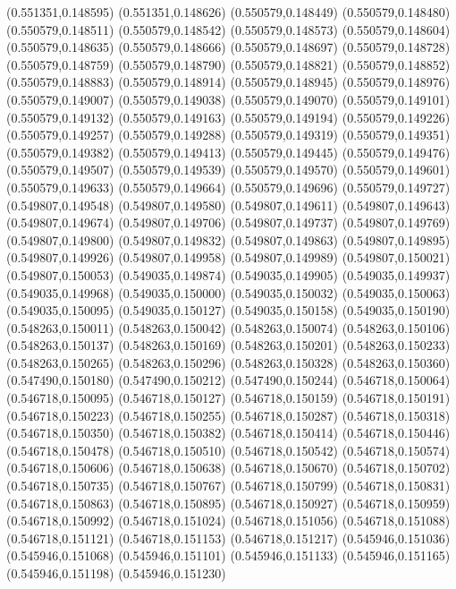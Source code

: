 (0.551351,0.148595)
(0.551351,0.148626)
(0.550579,0.148449)
(0.550579,0.148480)
(0.550579,0.148511)
(0.550579,0.148542)
(0.550579,0.148573)
(0.550579,0.148604)
(0.550579,0.148635)
(0.550579,0.148666)
(0.550579,0.148697)
(0.550579,0.148728)
(0.550579,0.148759)
(0.550579,0.148790)
(0.550579,0.148821)
(0.550579,0.148852)
(0.550579,0.148883)
(0.550579,0.148914)
(0.550579,0.148945)
(0.550579,0.148976)
(0.550579,0.149007)
(0.550579,0.149038)
(0.550579,0.149070)
(0.550579,0.149101)
(0.550579,0.149132)
(0.550579,0.149163)
(0.550579,0.149194)
(0.550579,0.149226)
(0.550579,0.149257)
(0.550579,0.149288)
(0.550579,0.149319)
(0.550579,0.149351)
(0.550579,0.149382)
(0.550579,0.149413)
(0.550579,0.149445)
(0.550579,0.149476)
(0.550579,0.149507)
(0.550579,0.149539)
(0.550579,0.149570)
(0.550579,0.149601)
(0.550579,0.149633)
(0.550579,0.149664)
(0.550579,0.149696)
(0.550579,0.149727)
(0.549807,0.149548)
(0.549807,0.149580)
(0.549807,0.149611)
(0.549807,0.149643)
(0.549807,0.149674)
(0.549807,0.149706)
(0.549807,0.149737)
(0.549807,0.149769)
(0.549807,0.149800)
(0.549807,0.149832)
(0.549807,0.149863)
(0.549807,0.149895)
(0.549807,0.149926)
(0.549807,0.149958)
(0.549807,0.149989)
(0.549807,0.150021)
(0.549807,0.150053)
(0.549035,0.149874)
(0.549035,0.149905)
(0.549035,0.149937)
(0.549035,0.149968)
(0.549035,0.150000)
(0.549035,0.150032)
(0.549035,0.150063)
(0.549035,0.150095)
(0.549035,0.150127)
(0.549035,0.150158)
(0.549035,0.150190)
(0.548263,0.150011)
(0.548263,0.150042)
(0.548263,0.150074)
(0.548263,0.150106)
(0.548263,0.150137)
(0.548263,0.150169)
(0.548263,0.150201)
(0.548263,0.150233)
(0.548263,0.150265)
(0.548263,0.150296)
(0.548263,0.150328)
(0.548263,0.150360)
(0.547490,0.150180)
(0.547490,0.150212)
(0.547490,0.150244)
(0.546718,0.150064)
(0.546718,0.150095)
(0.546718,0.150127)
(0.546718,0.150159)
(0.546718,0.150191)
(0.546718,0.150223)
(0.546718,0.150255)
(0.546718,0.150287)
(0.546718,0.150318)
(0.546718,0.150350)
(0.546718,0.150382)
(0.546718,0.150414)
(0.546718,0.150446)
(0.546718,0.150478)
(0.546718,0.150510)
(0.546718,0.150542)
(0.546718,0.150574)
(0.546718,0.150606)
(0.546718,0.150638)
(0.546718,0.150670)
(0.546718,0.150702)
(0.546718,0.150735)
(0.546718,0.150767)
(0.546718,0.150799)
(0.546718,0.150831)
(0.546718,0.150863)
(0.546718,0.150895)
(0.546718,0.150927)
(0.546718,0.150959)
(0.546718,0.150992)
(0.546718,0.151024)
(0.546718,0.151056)
(0.546718,0.151088)
(0.546718,0.151121)
(0.546718,0.151153)
(0.546718,0.151217)
(0.545946,0.151036)
(0.545946,0.151068)
(0.545946,0.151101)
(0.545946,0.151133)
(0.545946,0.151165)
(0.545946,0.151198)
(0.545946,0.151230)
